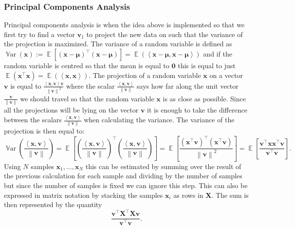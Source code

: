 \documentclass[a4paper, 12pt]{scrartcl}
\newcommand{\bfmu}{\boldsymbol{\mu}}
\newcommand{\bfx}{\mathbf{x}}
\newcommand{\inner}[2]{\left\langle #1, #2 \right\rangle}
\newcommand{\var}{\operatorname{\mathbb{V}ar}}
\newcommand{\ex}{\operatorname{\mathbb{E}}}
\begin{document}
\subsubsection*{Principal Components Analysis}
Principal components analysis is when the idea above is implemented so that we first try to find a vector $\mathbf{v}_1$ to project the new data on such that the variance of the projection is maximized.
The variance of a random variable is defined as $\var\left(\bfx\right):=\ex\left[\left(\bfx-\bfmu\right)^\intercal\left(\bfx-\bfmu\right)\right]=\ex\left(\inner{\bfx-\bfmu}{\bfx-\bfmu}\right)$ and if the random variable is centred so that the mean is equal to $\mathbf{0}$ this is equal to just $\ex\left(\bfx^\intercal\bfx\right)=\ex\left(\inner{\bfx}{\bfx}\right)$.
The projection of a random variable $\bfx$ on a vector $\mathbf{v}$ is equal to $\frac{\inner{\bfx}{\mathbf{v}}\mathbf{v}}{\left\|\mathbf{v}\right\|^2}$ where the scalar $\frac{\inner{\bfx}{\mathbf{v}}}{\left\|\mathbf{v}\right\|}$ says how far along the unit vector $\frac{\mathbf{v}}{\left\|\mathbf{v}\right\|}$ we should travel so that the random variable $\bfx$ is as close as possible.
Since all the projections will be lying on the vector $\mathbf{v}$ it is enough to take the difference between the scalars $\frac{\inner{\bfx}{\mathbf{v}}}{\left\|\mathbf{v}\right\|}$ when calculating the variance.
The variance of the projection is then equal to:
\begin{equation*}
	\var\left(\frac{\inner{\bfx}{\mathbf{v}}}{\left\|\mathbf{v}\right\|}\right)=\ex\left[\left(\frac{\inner{\bfx}{\mathbf{v}}}{\left\|\mathbf{v}\right\|}\right)^\intercal\left(\frac{\inner{\bfx}{\mathbf{v}}}{\left\|\mathbf{v}\right\|}\right)\right]=\ex\left[\frac{\left(\bfx^\intercal\mathbf{v}\right)^\intercal\left(\bfx^\intercal\mathbf{v}\right)}{\left\|\mathbf{v}\right\|^2}\right]=\ex\left[\frac{\mathbf{v}^\intercal\bfx\bfx^\intercal\mathbf{v}}{\mathbf{v}^\intercal\mathbf{v}}\right].
\end{equation*}
Using $N$ samples $\bfx_1,\dots,\bfx_N$ this can be estimated by summing over the result of the previous calculation for each sample and dividing by the number of samples but since the number of samples is fixed we can ignore this step.
This can also be expressed in matrix notation by stacking the samples $\bfx_i$ as rows in $\mathbf{X}$.
The sum is then represented by the quantity
\begin{equation*}
	\frac{\mathbf{v}^\intercal\mathbf{X}^\intercal\mathbf{X}\mathbf{v}}{\mathbf{v}^\intercal\mathbf{v}}.
\end{equation*}
\end{document}
